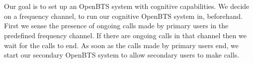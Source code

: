 \chapter*{}
Our goal is to set up an OpenBTS system with cognitive capabilities. We decide on a frequency channel, to run our cognitive OpenBTS system in, beforehand. First we sense the presence of ongoing calls made by primary users in the predefined frequency channel. If there are ongoing calls in that channel then we wait for the calls to end. As soon as the calls made by primary users end, we start our secondary OpenBTS system to allow secondary users to make calls.
